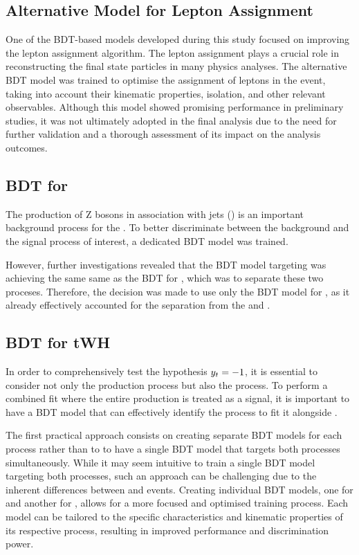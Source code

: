 \subsection{Alternative Model for Lepton Assignment}

One of the BDT-based models developed during this study focused on improving the lepton assignment algorithm. The lepton assignment plays a crucial role in reconstructing the final state particles in many physics analyses. The alternative BDT model was trained to optimise the assignment of leptons in the event, taking into account their kinematic properties, isolation, and other relevant observables. Although this model showed promising performance in preliminary studies, it was not ultimately adopted in the final analysis due to the need for further validation and a thorough assessment of its impact on the analysis outcomes.

\subsection{BDT for \Zjets}
The production of Z bosons in association with jets (\Zjets) is an important background process for the \dilepOStau. To better discriminate between the \Zjets background and the signal process of interest, a dedicated BDT model was trained. 

However, further investigations revealed that the BDT model targeting \ttbar was achieving the same
same as the BDT for \Zjets, which was to separate these two proceses. Therefore, the decision was 
made to use only the BDT model for \ttbar, as it already effectively accounted for the separation from the \Zjets and \ttbar.



\subsection{BDT for tWH}
In order to comprehensively test the hypothesis $y_{t} = -1$, it is essential to consider not only the \tHq production process but also the \tWH process. To perform a combined fit where the entire \tH production is treated as a signal, it is important to have a BDT model that can effectively identify the \tWH process to fit it alongside \tHq.

The first practical approach consists on creating separate BDT models for each process rather than to  to have a single BDT model that targets both processes simultaneously. While it may seem intuitive to train a single BDT model targeting both processes, such an approach can be challenging due to the inherent differences between \tHq and \tWH events. Creating individual BDT models, one for \tHq and another for \tWH, allows for a more focused and optimised training process. Each model can be tailored to the specific characteristics and kinematic properties of its respective process, resulting in improved performance and discrimination power.







